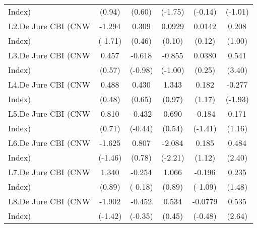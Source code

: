 {\begin{tabular}{l*{5}{c}}
Index)              &      (0.94)         &      (0.60)         &     (-1.75)         &     (-0.14)         &     (-1.01)         \\
[1em]
L2.De Jure CBI (CNW &      -1.294         &       0.309         &      0.0929         &      0.0142         &       0.208         \\
Index)              &     (-1.71)         &      (0.46)         &      (0.10)         &      (0.12)         &      (1.00)         \\
[1em]
L3.De Jure CBI (CNW &       0.457         &      -0.618         &      -0.855         &      0.0380         &       0.541\sym{***}\\
Index)              &      (0.57)         &     (-0.98)         &     (-1.00)         &      (0.25)         &      (3.40)         \\
[1em]
L4.De Jure CBI (CNW &       0.488         &       0.430         &       1.343         &       0.182         &      -0.277         \\
Index)              &      (0.48)         &      (0.65)         &      (0.97)         &      (1.17)         &     (-1.93)         \\
[1em]
L5.De Jure CBI (CNW &       0.810         &      -0.432         &       0.690         &      -0.184         &       0.171         \\
Index)              &      (0.71)         &     (-0.44)         &      (0.54)         &     (-1.41)         &      (1.16)         \\
[1em]
L6.De Jure CBI (CNW &      -1.625         &       0.807         &      -2.084\sym{*}  &       0.185         &       0.484\sym{*}  \\
Index)              &     (-1.46)         &      (0.78)         &     (-2.21)         &      (1.12)         &      (2.40)         \\
[1em]
L7.De Jure CBI (CNW &       1.340         &      -0.254         &       1.066         &      -0.196         &       0.235         \\
Index)              &      (0.89)         &     (-0.18)         &      (0.89)         &     (-1.09)         &      (1.48)         \\
[1em]
L8.De Jure CBI (CNW &      -1.902         &      -0.452         &       0.534         &     -0.0779         &       0.535\sym{**} \\
Index)              &     (-1.42)         &     (-0.35)         &      (0.45)         &     (-0.48)         &      (2.64)         \\

\end{tabular}}
